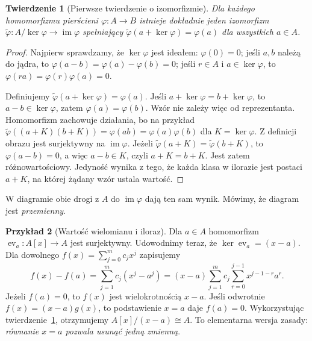 \documentclass[11pt,a4paper,openany]{report}
\numberwithin{equation}{section}
\theoremstyle{plain}
\newtheorem{twierdzenie}{Twierdzenie}[section]
\theoremstyle{definition}
\newtheorem{przyklad}[twierdzenie]{Przykład}
\theoremstyle{remark}
\newcommand{\im}{\operatorname{im}}
\newcommand{\kerf}{\operatorname{ker}}
\newcommand{\ev}{\operatorname{ev}}
\begin{document}
\begin{twierdzenie}[Pierwsze twierdzenie o izomorfizmie]
\label{tw:izo}
Dla każdego homomorfizmu pierścieni $\varphi\colon A\to B$
istnieje dokładnie jeden izomorfizm
$\widetilde\varphi\colon A/\kerf\varphi\to\im\varphi$
spełniający $\widetilde\varphi(a+\kerf\varphi)=\varphi(a)$
dla wszystkich $a\in A$.
\end{twierdzenie}
\begin{proof}
Najpierw sprawdzamy, że $\kerf\varphi$ jest ideałem:
$\varphi(0)=0$; jeśli $a,b$ należą do jądra, to
$\varphi(a-b)=\varphi(a)-\varphi(b)=0$;
jeśli $r\in A$ i $a\in\kerf\varphi$, to
$\varphi(ra)=\varphi(r)\varphi(a)=0$.

Definiujemy $\widetilde\varphi(a+\kerf\varphi)=\varphi(a)$.
Jeśli $a+\kerf\varphi=b+\kerf\varphi$, to
$a-b\in\kerf\varphi$, zatem $\varphi(a)=\varphi(b)$.
Wzór nie zależy więc od reprezentanta. Homomorfizm zachowuje działania,
bo na przykład
$\widetilde\varphi((a+K)(b+K))=\varphi(ab)
=\varphi(a)\varphi(b)$ dla $K=\kerf\varphi$.
Z definicji obrazu jest surjektywny na $\im\varphi$.
Jeżeli $\widetilde\varphi(a+K)=\widetilde\varphi(b+K)$,
to $\varphi(a-b)=0$, a więc $a-b\in K$, czyli $a+K=b+K$.
Jest zatem różnowartościowy. Jedyność wynika z tego, że każda klasa
w ilorazie jest postaci $a+K$, na której żądany wzór ustala wartość.
\end{proof}

\begin{center}
\end{center}
W diagramie obie drogi z $A$ do $\im\varphi$ dają ten sam wynik.
Mówimy, że diagram jest \emph{przemienny}.

\begin{przyklad}[Wartość wielomianu i iloraz]
Dla $a\in A$ homomorfizm $\ev_a\colon A[x]\to A$ jest surjektywny.
Udowodnimy teraz, że $\kerf\ev_a=(x-a)$.
Dla dowolnego $f(x)=\sum_{j=0}^m c_jx^j$ zapisujemy
\[
 f(x)-f(a)=\sum_{j=1}^m c_j(x^j-a^j)
 =(x-a)\sum_{j=1}^m c_j\sum_{r=0}^{j-1}x^{j-1-r}a^r.
\]
Jeżeli $f(a)=0$, to $f(x)$ jest wielokrotnością $x-a$.
Jeśli odwrotnie $f(x)=(x-a)g(x)$, to podstawienie $x=a$ daje $f(a)=0$.
Wykorzystując twierdzenie~\ref{tw:izo}, otrzymujemy
$A[x]/(x-a)\cong A$.
To elementarna wersja zasady: \emph{równanie $x=a$ pozwala usunąć
jedną zmienną}.
\end{przyklad}
\end{document}
